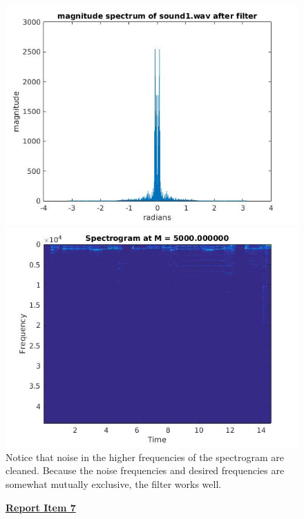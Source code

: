 \documentclass{article}
\begin{document}
\begin{figure}[H]
\includegraphics[scale = .5]{report6_3}
\includegraphics[scale = .5]{report6_4}
\\ Notice that noise in the higher frequencies of the spectrogram are cleaned. Because the noise frequencies and desired frequencies are somewhat mutually exclusive, the filter works well.
\end{figure}

\begin{figure}[H]
\color{red}
\underline{\textbf{Report Item 7}}
\color{black}

\end{figure}
\end{document}
